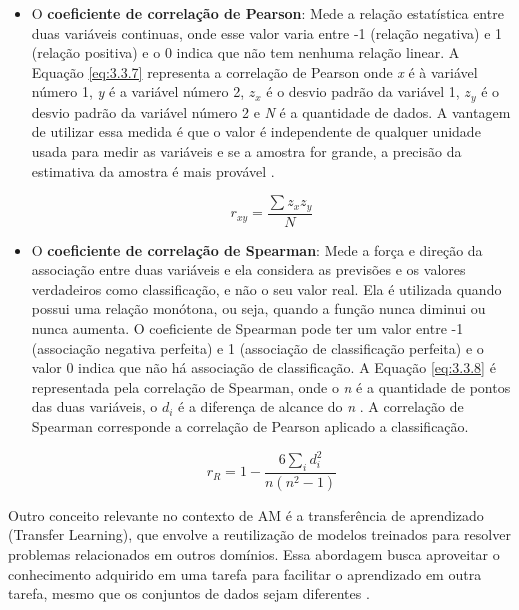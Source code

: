\begin{itemize}    
    \item O \textbf {coeficiente de correlação de Pearson}: Mede a relação estatística entre duas variáveis continuas, onde esse valor varia entre -1 (relação negativa) e 1 (relação positiva) e o 0 indica que não tem nenhuma relação linear. A Equação \ref{eq:3.3.7} representa a correlação de Pearson onde \textit{x} é à variável número 1, \textit{y} é a variável número 2, \textit{$z_{x}$} é o desvio padrão da variável 1, \textit{$z_{y}$} é o desvio padrão da variável número 2 e \textit{N} é a quantidade de dados. A vantagem de utilizar essa medida é que o valor é independente de qualquer unidade usada para medir as variáveis e se a amostra for grande, a precisão da estimativa da amostra é mais provável \cite{mukaka2012}.
    
    \begin{equation}
        r_{xy} = \frac {\sum z_{x}z_{y}}{N}
        \label{eq:3.3.7}
    \end{equation}
    
    \item O \textbf {coeficiente de correlação de Spearman}: Mede a força e direção da associação entre duas variáveis e ela considera as previsões e os valores verdadeiros como classificação, e não o seu valor real. Ela é utilizada quando possui uma relação monótona, ou seja,  quando a função nunca diminui ou nunca aumenta. O coeficiente de Spearman pode ter um valor entre -1 (associação negativa perfeita) e 1 (associação de classificação perfeita) e o valor 0 indica que não há associação de classificação. A Equação \ref{eq:3.3.8} é representada pela correlação de Spearman, onde o \textit{n} é a quantidade de pontos das duas variáveis, o \textit{$d_{i}$} é a diferença de alcance do \textit{n} \cite{mukaka2012}. A correlação de Spearman corresponde a correlação de Pearson aplicado a classificação.
    
    \begin{equation}
        r_{R} = 1 - \frac {6\sum_{i} d_{i}^2}{n(n^2-1)}
        \label{eq:3.3.8}
    \end{equation}
\end{itemize}

Outro conceito relevante no contexto de AM é a transferência de aprendizado (Transfer Learning), que envolve a reutilização de modelos treinados para resolver problemas relacionados em outros domínios. Essa abordagem busca aproveitar o conhecimento adquirido em uma tarefa para facilitar o aprendizado em outra tarefa, mesmo que os conjuntos de dados sejam diferentes \cite{shao2015}.

